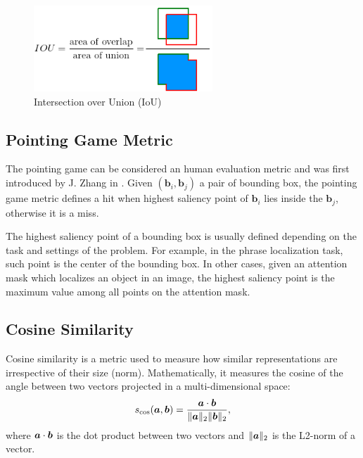\begin{figure}
  \centering
  \includegraphics[width=0.6\textwidth]{figures/iou.png}
  \caption[Intersection over Union (IoU)]{Intersection over Union (IoU) \cite{padilla2020survey}}
  \label{fig:iou}
\end{figure}

\subsection{Pointing Game Metric}
\label{subsec:pointing-game-metric}

The pointing game can be considered an human evaluation metric
\cite{petsiuk2018rise} and was first introduced by J. Zhang \etal{} in
\cite{zhang2018top}. Given $(\bm{b}_i , \bm{b}_j)$ a pair of bounding
box, the pointing game metric defines a hit when highest saliency point
of $\bm{b}_i$ lies inside the $\bm{b}_j$, otherwise it is a miss.

The highest saliency point of a bounding box is usually defined
depending on the task and settings of the problem. For example, in the
phrase localization task, such point is the center of the bounding
box. In other cases, given an attention mask which localizes an object
in an image, the highest saliency point is the maximum value among all
points on the attention mask.

\subsection{Cosine Similarity}

Cosine similarity is a metric used to measure how similar
representations are irrespective of their size (norm). Mathematically,
it measures the cosine of the angle between two vectors projected in a
multi-dimensional space:
\begin{equation}
  s_{\cos}(\bm{a}, \bm{b}) = \frac{\bm{a} \cdot \bm{b}}{\| \bm{a} \|_2 \| \bm{b} \|_2},
\end{equation}
where $\bm{a} \cdot \bm{b}$ is the dot product between two vectors and
$\| \bm{a} \|_2$ is the L2-norm of a vector.
